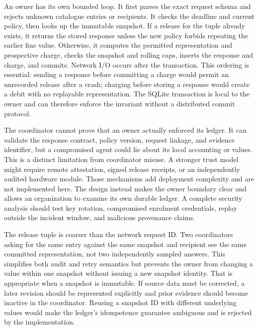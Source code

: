 \documentclass[conference,letterpaper]{IEEEtran}
\begin{document}
An owner has its own bounded loop. It first parses the exact request schema and rejects unknown catalogue entries or recipients. It checks the deadline and current policy, then looks up the immutable snapshot. If a release for the tuple already exists, it returns the stored response unless the new policy forbids repeating the earlier fine value. Otherwise, it computes the permitted representation and prospective charge, checks the snapshot and rolling caps, inserts the response and charge, and commits. Network I/O occurs after the transaction. This ordering is essential: sending a response before committing a charge would permit an unrecorded release after a crash; charging before storing a response would create a debit with no replayable representation. The SQLite transaction is local to the owner and can therefore enforce the invariant without a distributed commit protocol.

The coordinator cannot prove that an owner actually enforced its ledger. It can validate the response contract, policy version, request linkage, and evidence identifier, but a compromised agent could lie about its local accounting or values. This is a distinct limitation from coordinator misuse. A stronger trust model might require remote attestation, signed release receipts, or an independently audited hardware module. Those mechanisms add deployment complexity and are not implemented here. The design instead makes the owner boundary clear and allows an organization to examine its own durable ledger. A complete security analysis should test key rotation, compromised enrolment credentials, replay outside the incident window, and malicious provenance claims.

The release tuple is coarser than the network request ID. Two coordinators asking for the same entry against the same snapshot and recipient see the same committed representation, not two independently sampled answers. This simplifies both audit and retry semantics but prevents the owner from changing a value within one snapshot without issuing a new snapshot identity. That is appropriate when a snapshot is immutable. If source data must be corrected, a later revision should be represented explicitly and prior evidence should become inactive in the coordinator. Reusing a snapshot ID with different underlying values would make the ledger's idempotence guarantee ambiguous and is rejected by the implementation.
\end{document}

